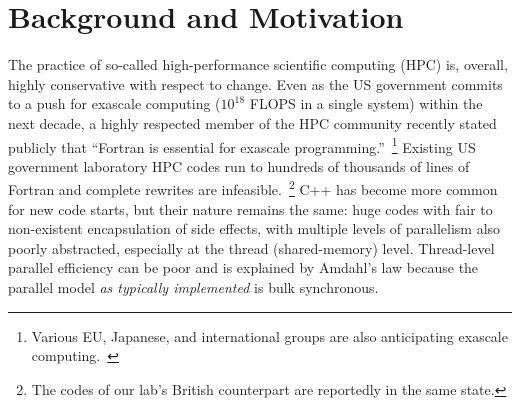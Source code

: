 \documentclass{llncs}
\begin{document}
\begin{abstract}
The claimed trend is an increasing appreciation and practice of functional
programming in scientific computing, and in particular strict (by default)
functional programming, in various guises.  Our project is the demonstration
of a light-weight, higher-order, polymorphic pure functional language
implementation in which we can experiment with automatic parallelization
strategies and varying degrees of default strictness.  Strictness constrains
the degree of potential parallelism, that is, we are not exploring speculative
evaluation.

\emph{Preliminary paper note 1: We are reporting work in progress.  At the
  time of writing we have a complete serial implementation, a primitive
  proof-of-concept parallel implementation, and are currently developing a
  more realistic parallel runtime.  We expect to have preliminary results from
  our new parallel implementation by the time of the symposium.}

\emph{Note 2: While this does not qualify as a student paper, students
  (undergraduate!)  have contributed considerably to this effort, and if
  accepted we plan to have one of these students present this paper.}

\emph{Note 3: Hopefully in the spirit of a student-friendly workshop, in this
  draft we have chosen a more conversational style of presentation than
  necessarily appropriate for a final paper, and have also highlighted the
  major student contributions, and perhaps gratuitous detail about process.}


\end{abstract}

\section{Background and Motivation}
The practice of so-called high-performance scientific computing (HPC) is,
overall, highly conservative with respect to change.  Even as the US
government commits to a push for exascale computing ($10^{18}$ FLOPS in a
single system) within the next decade, a highly respected member of the HPC
community recently stated publicly that ``Fortran is essential for exascale
programming.''~\cite{Heroux16}\footnote{Various EU, Japanese, and
  international groups are also anticipating exascale
  computing.~\cite{EUexascale,Exascale-org}} Existing US government laboratory
HPC codes run to hundreds of thousands of lines of Fortran and complete
rewrites are infeasible.~\footnote{The codes of our lab's British counterpart
  are reportedly in the same state.}  C++ has become more common for new code
starts, but their nature remains the same: huge codes with fair to
non-existent encapsulation of side effects, with multiple levels of
parallelism also poorly abstracted, especially at the thread (shared-memory)
level.  Thread-level parallel efficiency can be poor and is explained by
Amdahl's law because the parallel model \emph{as typically implemented} is
bulk synchronous.
\end{document}
